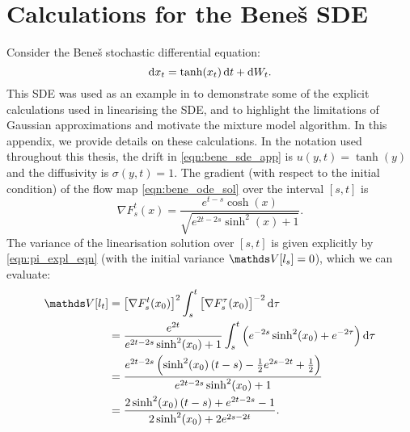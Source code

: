 
\chapter{Calculations for the Bene\v{s} SDE}\label{app:bene_calculations}
Consider the Bene\v{s} stochastic differential equation:
\begin{equation}
	\dif x_t = \tanh\!\left(x_t\right)\dif t + \dif W_t.
	\label{eqn:bene_sde_app}
\end{equation}
This SDE was used as an example in  to demonstrate some of the explicit calculations used in linearising the SDE, and to highlight the limitations of Gaussian approximations and motivate the mixture model algorithm.
In this appendix, we provide details on these calculations.
In the notation used throughout this thesis, the drift in \cref{eqn:bene_sde_app} is \(u\!\left(y,t\right) = \tanh\!\left(y\right)\) and the diffusivity is \(\sigma\!\left(y,t\right) = 1\).
The gradient (with respect to the initial condition) of the flow map \cref{eqn:bene_ode_sol} over the interval \([s,t]\) is
\[
	\nabla F_s^t\!\left(x\right) = \frac{e^{t-s}\cosh\!\left(x\right)}{\sqrt{e^{2t - 2s}\sinh^2\!\left(x\right) + 1}}.
\]
The variance of the linearisation solution over \([s,t]\) is given explicitly by \cref{eqn:pi_expl_eqn} (with the initial variance \(\var{l_s} = 0\)), which we can evaluate:
\begin{align*}
	\var{l_t} & = \left[\nabla F_s^t\!\left(x_0\right)\right]^2\int_s^t{\left[\nabla F_s^\tau\!\left(x_0\right)\right]^{-2}\dif\tau} \\
			& = \frac{e^{2t}}{e^{2t - 2s}\sinh^2\!\left(x_0\right) + 1}\int_s^t{\left(e^{- 2s}\sinh^2\!\left(x_0\right) + e^{- 2\tau}\right)\dif\tau} \\
			& = \frac{e^{2t - 2s}\left(\sinh^2\!\left(x_0\right)(t - s) - \frac12 e^{2s - 2t} + \frac12\right)}{e^{2t - 2s}\sinh^2\!\left(x_0\right) + 1} \\
			& = \frac{2\sinh^2\!\left(x_0\right)\left(t - s\right) + e^{2t - 2s} - 1}{2\sinh^2\!\left(x_0\right) + 2e^{2s - 2t}}.
\end{align*}






